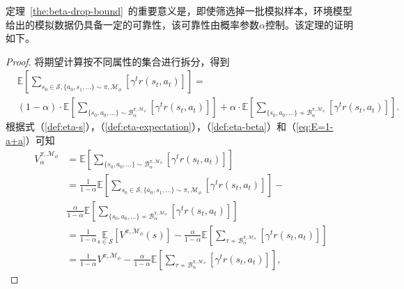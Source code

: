 定理~\ref{the:beta-drop-bound}~的重要意义是，即使筛选掉一批模拟样本，环境模型给出的模拟数据仍具备一定的可靠性，该可靠性由概率参数$\alpha$控制。该定理的证明如下。

\begin{proof}
将期望计算按不同属性的集合进行拆分，得到
\begin{equation}
\begin{aligned}
    &\mathbb{E}\left[{\sum}_{s_0\in\mathcal{S},\{a_0,s_1,\ldots\} \sim\pi,\mathcal{M}_\phi}\left[\gamma^t r(s_t,a_t)\right]\right] =\\
    &(1-\alpha)\cdot \mathbb{E}\left[{\sum}_{\{s_0,a_0,\ldots\} \sim\mathcal{B}_\alpha^{\pi,\mathcal{M}_\phi}}\left[\gamma^t r(s_t,a_t)\right]\right]+\alpha\cdot\mathbb{E}\left[{\sum}_{\{s_0,a_0,\ldots\} \not\sim\mathcal{B}_\alpha^{\pi,\mathcal{M}_\phi}}\left[\gamma^t r(s_t,a_t)\right]\right].
\end{aligned}\label{eq:E=1-a+a}
\end{equation}
根据式（\ref{def:eta-s}），（\ref{def:eta-expectation}），（\ref{def:eta-beta}）和（\ref{eq:E=1-a+a}）可知
\begin{equation}
\begin{aligned}
{V}^{\pi,\mathcal{M}_\phi}_\alpha&=\mathbb{E}\left[{\sum}_{\{s_0,a_0,\ldots\} \sim\mathcal{B}_\alpha^{\pi,\mathcal{M}_\phi}}\left[\gamma^t r(s_t,a_t)\right]\right]\\
&=\frac{1}{1-\alpha}\mathbb{E}\left[{\sum}_{s_0\in\mathcal{S},\{a_0,s_1,\ldots\} \sim\pi,\mathcal{M}_\phi}\left[\gamma^t r(s_t,a_t)\right]\right]-\\
&\frac{\alpha}{1-\alpha}\mathbb{E}\left[{\sum}_{\{s_0,a_0,\ldots\} \not\sim\mathcal{B}_\alpha^{\pi,\mathcal{M}_\phi}}\left[\gamma^t r(s_t,a_t)\right]\right]\\
&=\frac{1}{1-\alpha}\underset{s\in{\mathcal{S}}}{\mathbb{E}}\left[{V}^{\pi,\mathcal{M}_\phi}(s)\right]-\frac{\alpha}{1-\alpha}\mathbb{E}\left[{\sum}_{\tau \not\sim\mathcal{B}_\alpha^{\pi,\mathcal{M}_\phi}}\left[\gamma^t r(s_t,a_t)\right]\right]\\
&=\frac{1}{1-\alpha}{V}^{\pi,\mathcal{M}_\phi}-\frac{\alpha}{1-\alpha}\mathbb{E}\left[{\sum}_{\tau \not\sim\mathcal{B}_\alpha^{\pi,\mathcal{M}_\phi}}\left[\gamma^t r(s_t,a_t)\right]\right],\label{proof:lem42p1}

\end{aligned}
\end{equation}
\end{proof}
